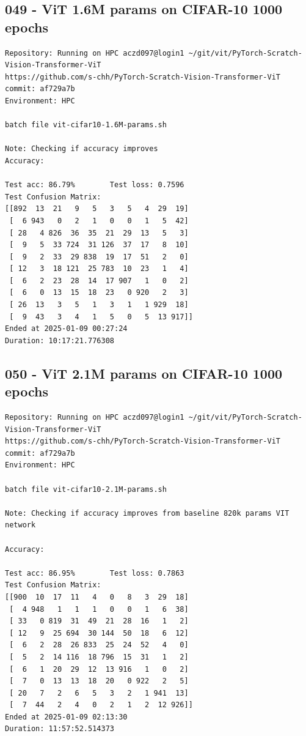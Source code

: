 \subsection{049 - ViT 1.6M params on CIFAR-10 1000 epochs}
\label{app_res:049}
\begin{verbatim}
Repository: Running on HPC aczd097@login1 ~/git/vit/PyTorch-Scratch-Vision-Transformer-ViT
https://github.com/s-chh/PyTorch-Scratch-Vision-Transformer-ViT
commit: af729a7b
Environment: HPC

batch file vit-cifar10-1.6M-params.sh

Note: Checking if accuracy improves
Accuracy: 

Test acc: 86.79%        Test loss: 0.7596
Test Confusion Matrix:
[[892  13  21   9   5   3   5   4  29  19]
 [  6 943   0   2   1   0   0   1   5  42]
 [ 28   4 826  36  35  21  29  13   5   3]
 [  9   5  33 724  31 126  37  17   8  10]
 [  9   2  33  29 838  19  17  51   2   0]
 [ 12   3  18 121  25 783  10  23   1   4]
 [  6   2  23  28  14  17 907   1   0   2]
 [  6   0  13  15  18  23   0 920   2   3]
 [ 26  13   3   5   1   3   1   1 929  18]
 [  9  43   3   4   1   5   0   5  13 917]]
Ended at 2025-01-09 00:27:24
Duration: 10:17:21.776308

\end{verbatim}

\subsection{050 - ViT 2.1M params on CIFAR-10 1000 epochs}
\label{app_res:050}
\begin{verbatim}
Repository: Running on HPC aczd097@login1 ~/git/vit/PyTorch-Scratch-Vision-Transformer-ViT
https://github.com/s-chh/PyTorch-Scratch-Vision-Transformer-ViT
commit: af729a7b
Environment: HPC

batch file vit-cifar10-2.1M-params.sh

Note: Checking if accuracy improves from baseline 820k params VIT network

Accuracy: 

Test acc: 86.95%        Test loss: 0.7863
Test Confusion Matrix:
[[900  10  17  11   4   0   8   3  29  18]
 [  4 948   1   1   1   0   0   1   6  38]
 [ 33   0 819  31  49  21  28  16   1   2]
 [ 12   9  25 694  30 144  50  18   6  12]
 [  6   2  28  26 833  25  24  52   4   0]
 [  5   2  14 116  18 796  15  31   1   2]
 [  6   1  20  29  12  13 916   1   0   2]
 [  7   0  13  13  18  20   0 922   2   5]
 [ 20   7   2   6   5   3   2   1 941  13]
 [  7  44   2   4   0   2   1   2  12 926]]
Ended at 2025-01-09 02:13:30
Duration: 11:57:52.514373

\end{verbatim}

